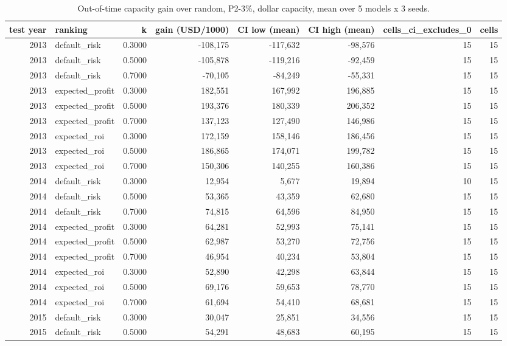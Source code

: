 \begin{table}[t]
\centering
\caption{Out-of-time capacity gain over random, P2-3\%, dollar capacity, mean over 5 models x 3 seeds.}
\label{tab:T8b_oot_capacity}
\small
\begin{tabular}{rlrrrrrr}
\toprule
test year & ranking & k & gain (USD/1000) & CI low (mean) & CI high (mean) & cells\_ci\_excludes\_0 & cells \\
\midrule
2013 & default\_risk & 0.3000 & -108,175 & -117,632 & -98,576 & 15 & 15 \\
2013 & default\_risk & 0.5000 & -105,878 & -119,216 & -92,459 & 15 & 15 \\
2013 & default\_risk & 0.7000 & -70,105 & -84,249 & -55,331 & 15 & 15 \\
2013 & expected\_profit & 0.3000 & 182,551 & 167,992 & 196,885 & 15 & 15 \\
2013 & expected\_profit & 0.5000 & 193,376 & 180,339 & 206,352 & 15 & 15 \\
2013 & expected\_profit & 0.7000 & 137,123 & 127,490 & 146,986 & 15 & 15 \\
2013 & expected\_roi & 0.3000 & 172,159 & 158,146 & 186,456 & 15 & 15 \\
2013 & expected\_roi & 0.5000 & 186,865 & 174,071 & 199,782 & 15 & 15 \\
2013 & expected\_roi & 0.7000 & 150,306 & 140,255 & 160,386 & 15 & 15 \\
2014 & default\_risk & 0.3000 & 12,954 & 5,677 & 19,894 & 10 & 15 \\
2014 & default\_risk & 0.5000 & 53,365 & 43,359 & 62,680 & 15 & 15 \\
2014 & default\_risk & 0.7000 & 74,815 & 64,596 & 84,950 & 15 & 15 \\
2014 & expected\_profit & 0.3000 & 64,281 & 52,993 & 75,141 & 15 & 15 \\
2014 & expected\_profit & 0.5000 & 62,987 & 53,270 & 72,756 & 15 & 15 \\
2014 & expected\_profit & 0.7000 & 46,954 & 40,234 & 53,804 & 15 & 15 \\
2014 & expected\_roi & 0.3000 & 52,890 & 42,298 & 63,844 & 15 & 15 \\
2014 & expected\_roi & 0.5000 & 69,176 & 59,653 & 78,770 & 15 & 15 \\
2014 & expected\_roi & 0.7000 & 61,694 & 54,410 & 68,681 & 15 & 15 \\
2015 & default\_risk & 0.3000 & 30,047 & 25,851 & 34,556 & 15 & 15 \\
2015 & default\_risk & 0.5000 & 54,291 & 48,683 & 60,195 & 15 & 15 \\

\end{tabular}
\end{table}
